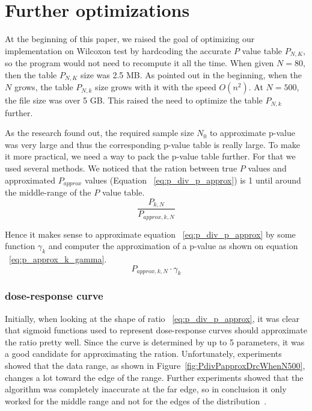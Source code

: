 \documentclass[12pt]{article}
\begin{document}
{\section{Further optimizations}
At the beginning of this paper, we raised the goal of optimizing our implementation on Wilcoxon test by hardcoding the accurate $P$ value table $P_{N, K}$, so the program would not need to recompute it all the time. When given $N = 80$, then the table $P_{N, K}$ size was 2.5 MB. As pointed out in the beginning, when the $N$ grows, the table $P_{N, k}$ size grows with it with the speed $O(n^2)$. At $N = 500$, the file size was over 5 GB. This raised the need to optimize the table $P_{N, k}$ further.

As the research found out, the required sample size $N_0$ to approximate p-value was very large and thus the corresponding p-value table is really large. To make it more practical, we need a way to pack the p-value table further. For that we used several methods. We noticed that the ration between true $P$ values and approximated $P_{approx}$ values (Equation ~\eqref{eq:p_div_p_approx}) is 1 until around the middle-range of the $P$ value table.
\begin{equation}\label{eq:p_div_p_approx}
  \frac{P_{k, N}}{P_{approx, k, N}}
\end{equation}

Hence it makes sense to approximate equation ~\eqref{eq:p_div_p_approx} by some function $\gamma_k$ and computer the approximation of a p-value as shown on equation ~\eqref{eq:p_approx_k_gamma}.
\begin{equation}\label{eq:p_approx_k_gamma}
  P_{approx, k, N} \cdot \gamma_k
\end{equation}


\subsubsection{dose-response curve}
Initially, when looking at the shape of ratio ~\eqref{eq:p_div_p_approx}, it was clear that sigmoid functions used to represent dose-response curves should approximate the ratio pretty well. Since the curve is determined by up to 5 parameters, it was a good candidate for approximating the ration. Unfortunately, experiments showed that the data range, as shown in Figure~\ref{fig:PdivPapproxDrcWhenN500}, changes a lot toward the edge of the range. Further experiments showed that the algorithm was completely inaccurate at the far edge, so in conclusion it only worked for the middle range and not for the edges of the distribution~\cite{dose_curve}.

}
\end{document}
